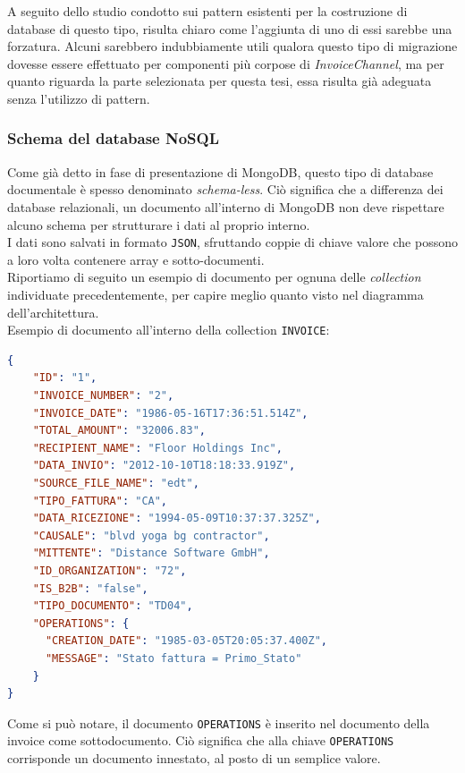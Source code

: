 \noindent A seguito dello studio condotto sui pattern esistenti per la costruzione di database di questo tipo, risulta chiaro come l'aggiunta di uno di essi sarebbe una forzatura. Alcuni sarebbero indubbiamente utili qualora questo tipo di migrazione dovesse essere effettuato per componenti più corpose di \textit{InvoiceChannel}, ma per quanto riguarda la parte selezionata per questa tesi, essa risulta già adeguata senza l'utilizzo di pattern.

\subsubsection{Schema del database NoSQL}
Come già detto in fase di presentazione di MongoDB, questo tipo di database documentale è spesso denominato \textit{schema-less}. Ciò significa che a differenza dei database relazionali, un documento all'interno di MongoDB non deve rispettare alcuno schema per strutturare i dati al proprio interno.\\
I dati sono salvati in formato \texttt{JSON}, sfruttando coppie di chiave valore che possono a loro volta contenere array e sotto-documenti.\\
Riportiamo di seguito un esempio di documento per ognuna delle \textit{collection} individuate precedentemente, per capire meglio quanto visto nel diagramma dell'architettura.\\

\noindent Esempio di documento all'interno della collection \texttt{INVOICE}:
\begin{lstlisting}[language=json,
        deletekeywords={IDENTITY,INT},
        morekeywords={clustered},    
        framesep=10pt,
        framextopmargin=10pt]
{
    "ID": "1",
    "INVOICE_NUMBER": "2",
    "INVOICE_DATE": "1986-05-16T17:36:51.514Z",
    "TOTAL_AMOUNT": "32006.83",
    "RECIPIENT_NAME": "Floor Holdings Inc",
    "DATA_INVIO": "2012-10-10T18:18:33.919Z",
    "SOURCE_FILE_NAME": "edt",
    "TIPO_FATTURA": "CA",
    "DATA_RICEZIONE": "1994-05-09T10:37:37.325Z",
    "CAUSALE": "blvd yoga bg contractor",
    "MITTENTE": "Distance Software GmbH",
    "ID_ORGANIZATION": "72",
    "IS_B2B": "false",
    "TIPO_DOCUMENTO": "TD04",
    "OPERATIONS": {
      "CREATION_DATE": "1985-03-05T20:05:37.400Z",
      "MESSAGE": "Stato fattura = Primo_Stato"
    }
}
\end{lstlisting}
\noindent Come si può notare, il documento \texttt{OPERATIONS} è inserito nel documento della invoice come sottodocumento. Ciò significa che alla chiave \texttt{OPERATIONS} corrisponde un documento innestato, al posto di un semplice valore.\\

